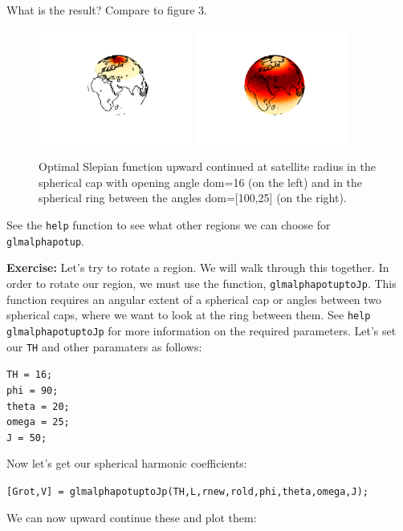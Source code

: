 \documentclass[11pt]{article}
\begin{document}
What is the result? Compare to figure 3.
\begin{figure}[H]
  \centering
  \includegraphics[width=0.45\textwidth]{figures/dom16ml.png}
  \includegraphics[width=0.45\textwidth]{figures/dom100_25ml.png}
  \caption{Optimal Slepian function upward continued at satellite radius in the spherical cap with opening angle dom=16 (on the left) and in the spherical ring between the angles dom=[100,25] (on the right).}
\label{dom}
\end{figure}
See the \verb+help+ function to see what other regions we can choose for \verb+glmalphapotup+.

\textbf{Exercise:} Let's try to rotate a region.  We will walk through this together.  In order to rotate our region, we must use the function, \verb|glmalphapotuptoJp|.  This function requires an angular extent of a spherical cap or angles between two spherical caps, where we want to look at the ring between them.  See \verb|help glmalphapotuptoJp| for more information on the required parameters.  Let's set our \verb|TH| and other paramaters as follows:

\verb|TH = 16;|\\
\verb|phi = 90;|\\
\verb|theta = 20;|\\
\verb|omega = 25;|\\
\verb|J = 50;|

Now let's get our spherical harmonic coefficients:

\verb|[Grot,V] = glmalphapotuptoJp(TH,L,rnew,rold,phi,theta,omega,J);|

We can now upward continue these and plot them:
\end{document}
